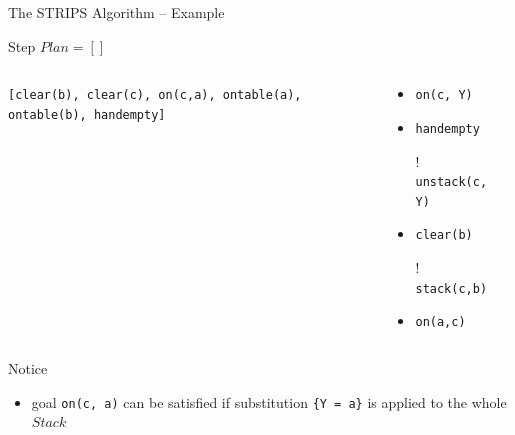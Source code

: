 \documentclass[presentation]{beamer}\mode<presentation>{\usetheme{AMSBolognaFC}}
\begin{document}
\begin{frame}[c]{The STRIPS Algorithm -- Example}
\small

    \begin{exampleblock}{Step \nextStripsExampleStep{} \hfill $Plan = []$}
        \begin{columns}[t]
            \begin{column}{.30\linewidth}\centering
                \texttt{[clear(b), clear(c), \alert{on(c,a)}, ontable(a), ontable(b), handempty]}
            \end{column}
            \begin{column}{.50\linewidth}\centering
                \begin{itemize}
                    \item \alert{\texttt{on(c, Y)}}
                    \item \texttt{handempty}
                    \item[!] \texttt{unstack(c, Y)}
                    \item \texttt{clear(b)}
                    \item[!] \texttt{stack(c,b)}
                    \item \texttt{on(a,c)}
                \end{itemize}
            \end{column}
            \begin{column}{.10\linewidth}\centering
                
            \end{column}
        \end{columns}
    \end{exampleblock}

    \vfill

    \footnotesize
    Notice
    \begin{itemize}\tiny
        \item goal \texttt{on(c, a)} can be satisfied if substitution \texttt{\{Y = a\}} is applied to the whole $Stack$
    \end{itemize}

\end{frame}
\end{document}
